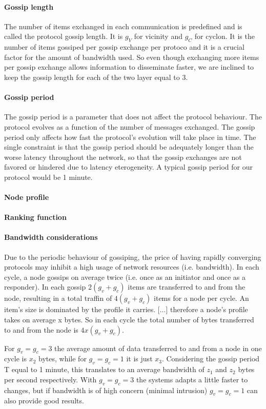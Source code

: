 \paragraph{Gossip length} The number of items exchanged in each communication is predefined and is called the protocol gossip length. It is $g_V$ for vicinity and $g_C$ for cyclon. It is the number of items gossiped per gossip exchange per protoco and it is a crucial factor for the amount of bandwidth used. So even though exchanging more items per gossip exchange allows information to disseminate faster, we are inclined to keep the gossip length for each of the two layer equal to 3.

\paragraph{Gossip period} The gossip period is a parameter that does not affect the protocol behaviour. The protocol evolves as a function of the number of messages exchanged. The gossip period only affects how fast the protocol's evolution will take place in time. The single constraint is that the gossip period should be adequately longer than the worse latency throughout the network, so that the gossip exchanges are not favored or hindered due to latency eterogeneity. A typical gossip period for our protocol would be 1 minute.

\paragraph{Node profile}

\paragraph{Ranking function}

\paragraph{Bandwidth considerations} Due to the periodic behaviour of gossiping, the price of having rapidly converging protocols may inhibit a high usage of network resources (i.e. bandwidth). In each cycle, a node gossips on average twice (i.e. once as an initiator and once as a responder). In each gossip $2(g_v+g_c)$ items are transferred to and from the node, resulting in a total traffin of $4(g_v+g_c)$ items for a node per cycle. An item's size is dominated by the profile it carries. [...] therefore a node's profile takes on average x bytes. So in each cycle the total number of bytes transferred to and from the node is $4 x (g_v+g_c)$.

For $g_v=g_c=3$ the average amount of data transferred to and from a node in one cycle is $x_2$ bytes, while for $g_v=g_c=1$ it is just $x_3$. Considering the gossip period T equal to 1 minute, this translates to an average bandwidth of $z_1$ and $z_2$ bytes per second respectively. With $g_v=g_c=3$ the systems adapts a little faster to changes, but if bandwidth is of high concern (minimal intrusion) $g_v=g_c=1$ can also provide good results.



